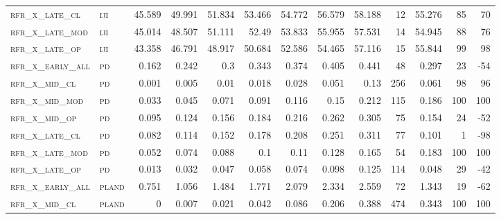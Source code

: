 \begin{landscape}
\begin{center}
\begin{footnotesize}
\begin{longtable}{llrrrrrrrr|rrr}
\textsc{rfr\_x\_late\_cl  } & \textsc{iji       }   & 45.589  & 49.991  & 51.834  & 53.466   & 54.772   & 56.579   & 58.188   & 12     & 55.276        & 85            & 70              \\
\textsc{rfr\_x\_late\_mod } & \textsc{iji       }   & 45.014  & 48.507  & 51.111  & 52.49    & 53.833   & 55.955   & 57.531   & 14     & 54.945        & 88            & 76              \\
\textsc{rfr\_x\_late\_op  } & \textsc{iji       }   & 43.358  & 46.791  & 48.917  & 50.684   & 52.586   & 54.465   & 57.116   & 15     & 55.844        & 99            & 98              \\
\textsc{rfr\_x\_early\_all} & \textsc{pd        }   & 0.162   & 0.242   & 0.3     & 0.343    & 0.374    & 0.405    & 0.441    & 48     & 0.297         & 23            & -54             \\
\textsc{rfr\_x\_mid\_cl   } & \textsc{pd        }   & 0.001   & 0.005   & 0.01    & 0.018    & 0.028    & 0.051    & 0.13     & 256    & 0.061         & 98            & 96              \\
\textsc{rfr\_x\_mid\_mod  } & \textsc{pd        }   & 0.033   & 0.045   & 0.071   & 0.091    & 0.116    & 0.15     & 0.212    & 115    & 0.186         & 100           & 100             \\
\textsc{rfr\_x\_mid\_op   } & \textsc{pd        }   & 0.095   & 0.124   & 0.156   & 0.184    & 0.216    & 0.262    & 0.305    & 75     & 0.154         & 24            & -52             \\
\textsc{rfr\_x\_late\_cl  } & \textsc{pd        }   & 0.082   & 0.114   & 0.152   & 0.178    & 0.208    & 0.251    & 0.311    & 77     & 0.101         & 1             & -98             \\
\textsc{rfr\_x\_late\_mod } & \textsc{pd        }   & 0.052   & 0.074   & 0.088   & 0.1      & 0.11     & 0.128    & 0.165    & 54     & 0.183         & 100           & 100             \\
\textsc{rfr\_x\_late\_op  } & \textsc{pd        }   & 0.013   & 0.032   & 0.047   & 0.058    & 0.074    & 0.098    & 0.125    & 114    & 0.048         & 29            & -42             \\
\textsc{rfr\_x\_early\_all} & \textsc{pland     }   & 0.751   & 1.056   & 1.484   & 1.771    & 2.079    & 2.334    & 2.559    & 72     & 1.343         & 19            & -62             \\
\textsc{rfr\_x\_mid\_cl   } & \textsc{pland     }   & 0       & 0.007   & 0.021   & 0.042    & 0.086    & 0.206    & 0.388    & 474    & 0.343         & 100           & 100             \\

\end{longtable}
\end{footnotesize}
\end{center}
\end{landscape}
